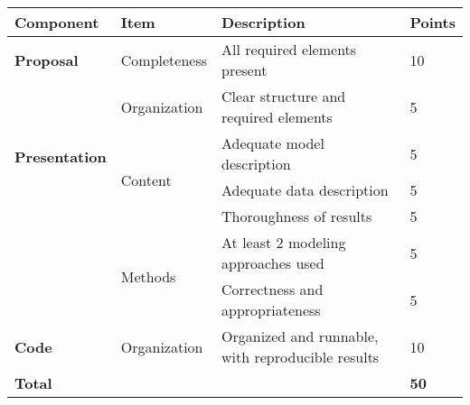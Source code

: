 \documentclass[11pt,twoside]{article}
\newcommand{\?}{\stackrel{?}{=}}
\begin{document}
\begin{tabular}{m{1in} m{1in} m{3.5in} m{.5in}}\toprule
  \bf Component & \bf Item & \bf Description & \bf Points \\ \midrule
  \textbf{Proposal} & Completeness  & All required elements present & 10 \\\midrule
  \multirow{4}{*}{\textbf{Presentation}} & Organization  & Clear structure and required elements  & 5 \\\cmidrule{2-4}
                &  \multirow{3}{*}{Content} & Adequate model description  & 5\\\cmidrule{3-4}
                & & Adequate data description  & 5\\\cmidrule{3-4}
                & & Thoroughness of results & 5 \\\cmidrule{2-4}
                &  \multirow{2}{*}{Methods}  & At least 2 modeling approaches used & 5 \\ \cmidrule{3-4}
                         &    & Correctness and appropriateness  & 5 \\\midrule
  \textbf{Code} &  Organization & Organized and runnable, with reproducible results & 10 \\ \midrule
  \bf Total & & & \bf 50 \\\bottomrule
\end{tabular}

 
\end{document}
